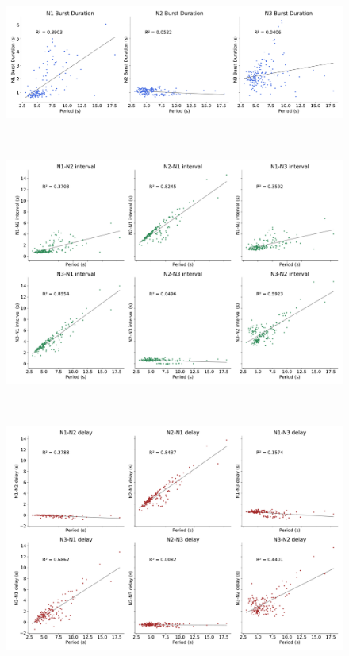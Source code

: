 \begin{figure}[htbp]
\begin{minipage}{0.9\textwidth}
\begin{minipage}[b]{0.53\textwidth}
			\begin{minipage}[b]{\textwidth}
				\centering
				\includegraphics[width=\textwidth]{./invariants/data/SUSSEX/prep1/images/spontaneous_durations.pdf}
			\end{minipage}\\
			\begin{minipage}[b]{\textwidth}
				\centering
				\includegraphics[width=\textwidth]{./invariants/data/SUSSEX/prep1/images/spontaneous_intervals.pdf}
			\end{minipage}\\
			\begin{minipage}[b]{\textwidth}
				\centering
				\includegraphics[width=\textwidth]{./invariants/data/SUSSEX/prep1/images/spontaneous_delays.pdf}

\end{minipage}
\end{minipage}
\end{minipage}
\end{figure}
